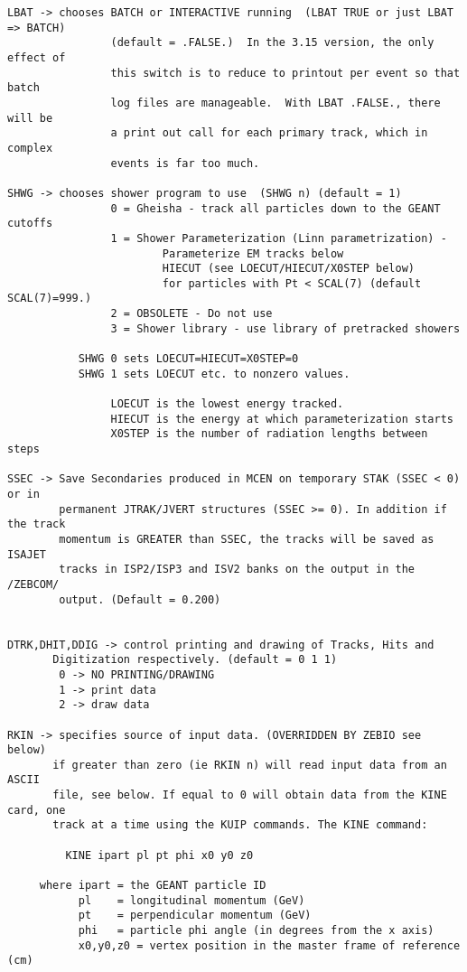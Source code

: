 \begin{verbatim}
LBAT -> chooses BATCH or INTERACTIVE running  (LBAT TRUE or just LBAT => BATCH)
                (default = .FALSE.)  In the 3.15 version, the only effect of
                this switch is to reduce to printout per event so that batch
                log files are manageable.  With LBAT .FALSE., there will be
                a print out call for each primary track, which in complex
                events is far too much.

SHWG -> chooses shower program to use  (SHWG n) (default = 1)
                0 = Gheisha - track all particles down to the GEANT cutoffs
                1 = Shower Parameterization (Linn parametrization) -
                        Parameterize EM tracks below
                        HIECUT (see LOECUT/HIECUT/X0STEP below)
                        for particles with Pt < SCAL(7) (default SCAL(7)=999.)
                2 = OBSOLETE - Do not use
                3 = Shower library - use library of pretracked showers

           SHWG 0 sets LOECUT=HIECUT=X0STEP=0
           SHWG 1 sets LOECUT etc. to nonzero values.

                LOECUT is the lowest energy tracked.
                HIECUT is the energy at which parameterization starts
                X0STEP is the number of radiation lengths between steps

SSEC -> Save Secondaries produced in MCEN on temporary STAK (SSEC < 0) or in
        permanent JTRAK/JVERT structures (SSEC >= 0). In addition if the track
        momentum is GREATER than SSEC, the tracks will be saved as ISAJET
        tracks in ISP2/ISP3 and ISV2 banks on the output in the /ZEBCOM/
        output. (Default = 0.200)


DTRK,DHIT,DDIG -> control printing and drawing of Tracks, Hits and
       Digitization respectively. (default = 0 1 1)
        0 -> NO PRINTING/DRAWING
        1 -> print data
        2 -> draw data

RKIN -> specifies source of input data. (OVERRIDDEN BY ZEBIO see below)
       if greater than zero (ie RKIN n) will read input data from an ASCII
       file, see below. If equal to 0 will obtain data from the KINE card, one
       track at a time using the KUIP commands. The KINE command:

         KINE ipart pl pt phi x0 y0 z0

     where ipart = the GEANT particle ID
           pl    = longitudinal momentum (GeV)
           pt    = perpendicular momentum (GeV)
           phi   = particle phi angle (in degrees from the x axis)
           x0,y0,z0 = vertex position in the master frame of reference (cm)


\end{verbatim}

